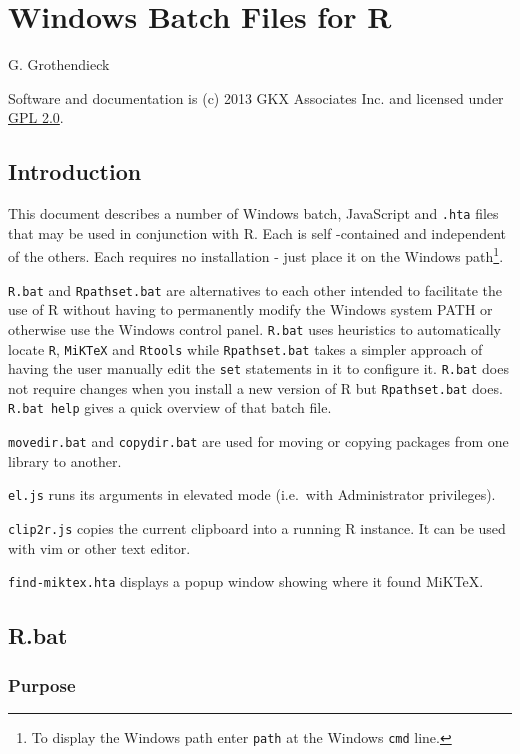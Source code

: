 \section{Windows Batch Files for R}

G. Grothendieck

Software and documentation is (c) 2013 GKX Associates Inc. and licensed
under \href{http://www.gnu.org/licenses/gpl-2.0.html}{GPL 2.0}.

\subsection{Introduction}

This document describes a number of Windows batch, JavaScript and
\texttt{.hta} files that may be used in conjunction with R. Each is self
-contained and independent of the others. Each requires no installation -
just place it on the Windows path\footnote{To display the Windows path
  enter \texttt{path} at the Windows \texttt{cmd} line.}.

\texttt{R.bat} and \texttt{Rpathset.bat} are alternatives to each other
intended to facilitate the use of R without having to permanently modify
the Windows system PATH or otherwise use the Windows control panel.
\texttt{R.bat} uses heuristics to automatically locate \texttt{R},
\texttt{MiKTeX} and \texttt{Rtools} while \texttt{Rpathset.bat} takes a
simpler approach of having the user manually edit the \texttt{set}
statements in it to configure it. \texttt{R.bat} does not require
changes when you install a new version of R but \texttt{Rpathset.bat}
does. \texttt{R.bat help} gives a quick overview of that batch file.

\texttt{movedir.bat} and \texttt{copydir.bat} are used for moving or
copying packages from one library to another.

\texttt{el.js} runs its arguments in elevated mode (i.e.~with
Administrator privileges).

\texttt{clip2r.js} copies the current clipboard into a running R
instance. It can be used with vim or other text editor.

\texttt{find-miktex.hta} displays a popup window showing where it found
MiKTeX.

\subsection{R.bat}

\subsubsection{Purpose}


